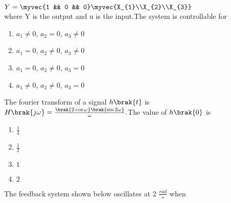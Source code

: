                     $Y=\myvec{1 && 0 && 0}\myvec{X_{1}\\X_{2}\\X_{3}}$\\
        where Y is the output and u is the input.The system is controllable for 
        \begin{enumerate}
            \item$a_{1}\neq0$, $a_{2}=0$, $a_{3}\neq0$\\
            \item$a_{1}=0$, $a_{2}\neq0$, $a_{3}\neq0$\\
            \item$a_{1}=0$, $a_{2}\neq0$, $a_{3}=0$\\
            \item$a_{1}\neq0$, $a_{2}\neq0$, $a_{3}=0$ 
        \end{enumerate}
      \item The fourier transform of a signal $h\brak{t}$ is $H\brak{j\omega}=\frac{\brak{2\cos{\omega}}\brak{\sin {2\omega}}}{\omega}.$The value of $h\brak{0}$ is 
       \begin{enumerate}
           \item$\frac{1}{4}$
           \item$\frac{1}{2}$
           \item$1$\\
          \item$2$
       \end{enumerate}
       \item The feedback system shown below oscillates at 2 $\frac{rad}{s}$ when\\
    

